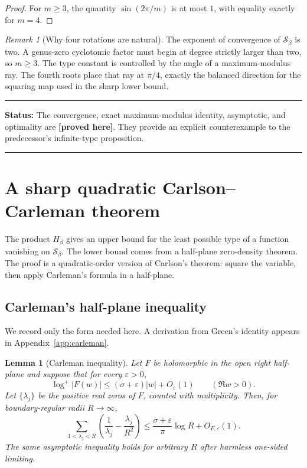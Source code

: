 \documentclass[11pt,oneside]{article}
\newtheorem{lemma}[theorem]{Lemma}
\theoremstyle{definition}
\theoremstyle{remark}
\newtheorem{remark}[theorem]{Remark}
\newcommand{\Sbeta}{\mathcal S_\beta}
\newcommand{\statusproved}{\textcolor{provedgreen}{\textbf{[proved here]}}}
\newenvironment{statusbox}[1]
{\begin{center}\begin{minipage}{0.94\textwidth}\raggedright\hrule\vspace{0.45em}\textbf{Status:} #1\par\vspace{0.35em}}
{\vspace{0.35em}\hrule\end{minipage}\end{center}}
\begin{document}
\begin{proof}
For $m\ge3$, the quantity $\sin(2\pi/m)$ is at most $1$, with equality exactly for
$m=4$.
\end{proof}

\begin{remark}[Why four rotations are natural]
The exponent of convergence of $\Sbeta$ is two.  A genus-zero cyclotomic factor must begin
at degree strictly larger than two, so $m\ge3$.  The type constant is controlled by the
angle of a maximum-modulus ray.  The fourth roots place that ray at $\pi/4$, exactly the
balanced direction for the squaring map used in the sharp lower bound.
\end{remark}

\begin{statusbox}{The convergence, exact maximum-modulus identity, asymptotic, and optimality
are \statusproved.  They provide an explicit counterexample to the predecessor's
infinite-type proposition.}
\end{statusbox}

\section{A sharp quadratic Carlson--Carleman theorem}
\label{sec:carleman}

The product $H_\beta$ gives an upper bound for the least possible type of a function
vanishing on $\Sbeta$.  The lower bound comes from a half-plane zero-density theorem.  The
proof is a quadratic-order version of Carlson's theorem: square the variable, then apply
Carleman's formula in a half-plane.

\subsection{Carleman's half-plane inequality}

We record only the form needed here.  A derivation from Green's identity appears in
Appendix~\ref{app:carleman}.

\begin{lemma}[Carleman inequality]
\label{lem:carleman}
Let $F$ be holomorphic in the open right half-plane and suppose that for every
$\varepsilon>0$,
\[
 \log^+|F(w)|\le(\sigma+\varepsilon)|w|+O_\varepsilon(1)
 \qquad(\Re w>0).
\]
Let $\{\lambda_j\}$ be the positive real zeros of $F$, counted with multiplicity.  Then,
for boundary-regular radii $R\to\infty$,
\begin{equation}
 \sum_{1<\lambda_j<R}
 \left(\frac1{\lambda_j}-\frac{\lambda_j}{R^2}\right)
 \le \frac{\sigma+\varepsilon}{\pi}\log R+O_{F,\varepsilon}(1).
 \label{eq:carlemanineq}
\end{equation}
The same asymptotic inequality holds for arbitrary $R$ after harmless one-sided limiting.
\end{lemma}
\end{document}
